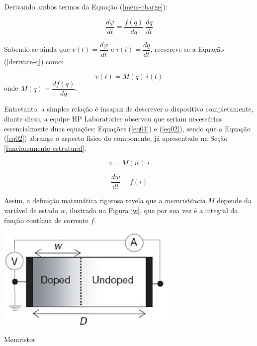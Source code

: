 \documentclass{ceel}
\begin{document}
\begin{multicols}{2}
Derivando ambos termos da Equação (\ref{mem-charge}):

\begin{equation}\label{derivate-q}
\dfrac{d\varphi}{dt}=\dfrac{f(q)}{dq} \ \dfrac{dq}{dt}
\end{equation}

Sabendo-se ainda que $v(t)=\dfrac{d\varphi}{dt}$ e $i(t)=\dfrac{dq}{dt}$, reescreve-se a Equação (\ref{derivate-q}) como:

\begin{equation}\label{derivate-q}
v(t)=M(q)\ i(t)
\end{equation}
\noindent onde $M(q) =\dfrac{df(q)}{dq}$.

Entretanto, a simples relação é incapaz de descrever o dispositivo completamente, diante disso, a equipe HP Laboratories observou que seriam necessárias essencialmente duas equações: Equações (\ref{eq01}) e (\ref{eq02}), sendo que a Equação (\ref{eq02}) abrange o aspecto físico do componente, já apresentado na Seção \ref{funcionamento-estrutural}.

\begin{equation}\label{eq01}
v=M( w) \ i
\end{equation}

\begin{equation}\label{eq02}
\dfrac{dw}{dt} =f(i) 
\end{equation}

Assim, a definição matemática rigorosa revela que a \emph{memristência} $M$ depende da variável de estado $w$, ilustrada na Figura \ref{w}, que por sua vez é a integral da função contínua de corrente $f$.

\begin{minipage}[h]{\columnwidth}
\centering
\captionsetup{type=figure}
\includegraphics[width=0.8\columnwidth]{memristor004}
\caption{Memristor}\label{w}
\end{minipage}


\end{multicols}
\end{document}
